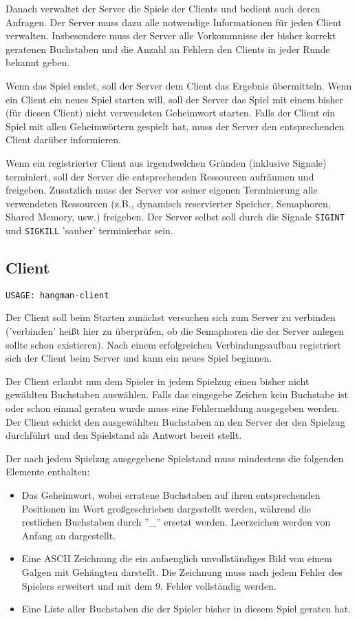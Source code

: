 Danach verwaltet der Server die Spiele der Clients und bedient auch deren Anfragen. 
Der Server muss dazu alle notwendige Informationen
für jeden Client verwalten. Insbesondere muss der Server alle Vorkommnisse der bisher korrekt 
geratenen Buchstaben und die Anzahl an Fehlern den Clients in jeder Runde bekannt geben.

Wenn das Spiel endet, soll der Server dem Client das Ergebnis übermitteln.
Wenn ein Client ein neues Spiel starten will, soll der Server das Spiel mit einem
bisher (für diesen Client) nicht verwendeten
Geheimwort starten.
Falls der Client ein Spiel mit allen Geheimwörtern gespielt hat, muss der Server den 
entsprechenden Client darüber informieren.

Wenn ein registrierter Client aus irgendwelchen Gründen (inklusive Signale) terminiert,
soll der Server die entsprechenden Ressourcen aufräumen und freigeben.
Zusatzlich muss der Server vor seiner eigenen Terminierung alle 
verwendeten Ressourcen
(z.B., dynamisch reservierter Speicher, Semaphoren, Shared Memory, usw.) freigeben.
Der Server selbst soll durch 
die Signale \verb|SIGINT| und \verb|SIGKILL| 'sauber' terminierbar sein.



\subsection*{Client}

\begin{verbatim}
USAGE: hangman-client
\end{verbatim}

Der Client soll beim Starten zunächst versuchen sich zum Server zu verbinden ('verbinden' heißt hier zu
überprüfen, ob die Semaphoren die der Server anlegen sollte schon existieren).
Nach einem erfolgreichen Verbindungsaufbau registriert sich der Client beim Server und kann ein neues 
Spiel beginnen. 

Der Client erlaubt nun dem Spieler in jedem Spielzug einen bisher nicht gewählten Buchstaben auswählen.
Falls das eingegebe Zeichen kein Buchstabe ist oder schon einmal geraten wurde
muss eine Fehlermeldung ausgegeben werden. Der Client schickt den ausgew{\"a}hlten Buchstaben
an den Server der den Spielzug durchf{\"u}hrt und den Spielstand als Antwort bereit stellt. 

Der nach jedem Spielzug ausgegebene Spielstand muss mindestens die folgenden Elemente enthalten:
\begin{itemize}
  \item Das Geheimwort, wobei erratene Buchstaben auf ihren entsprechenden Positionen im Wort 
        gro{\ss}geschrieben dargestellt werden, während die restlichen Buchstaben durch ''\_'' ersetzt werden. 
        Leerzeichen werden von Anfang an dargestellt.
  \item Eine ASCII Zeichnung die ein anfaenglich unvollständiges Bild von einem Galgen mit Gehängten darstellt. Die Zeichnung 
        muss nach jedem Fehler des Spielers erweitert und mit dem 9. Fehler vollständig werden.
  \item Eine Liste aller Buchstaben die der Spieler bisher in diesem Spiel geraten hat.
\end{itemize}

